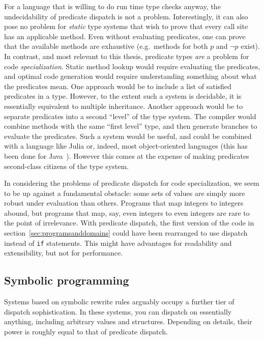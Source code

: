 For a language that is willing to do run time type checks anyway, the
undecidability of predicate dispatch is not a problem.
Interestingly, it can also pose no problem for \emph{static} type systems
that wish to prove that every call site has an applicable method.
Even without evaluating predicates, one can prove that the available methods
are exhaustive (e.g.\ methods for both $p$ and $\neg p$ exist).
In contrast, and most relevant to this thesis, predicate types \emph{are} a
problem for code \emph{specialization}.
Static method lookup would require evaluating the predicates, and optimal code
generation would require understanding something about what the predicates mean.
One approach would be to include a list of satisfied predicates in a type.
However, to the extent such a system is decidable, it is essentially equivalent
to multiple inheritance.
Another approach would be to separate predicates into a second ``level'' of the
type system.
The compiler would combine methods with the same ``first level'' type, and then
generate branches to evaluate the predicates.
Such a system would be useful, and could be
combined with a language like Julia or, indeed, most object-oriented
languages (this has been done for Java~\cite{Millstein:2009:EMP:1462166.1462168}).
However this comes at the expense of making predicates second-class
citizens of the type system.

In considering the problems of predicate dispatch for code specialization,
we seem to be up against a fundamental obstacle: some sets of values are
simply more robust under evaluation than others.
Programs that map integers to integers abound, but programs that map, say,
even integers to even integers are rare to the point of irrelevance.
With predicate dispatch, the first version of the code in
section~\ref{sec:programsanddomains} could have been rearranged to use
dispatch instead of \texttt{if} statements.
This might have advantages for readability and extensibility, but not for
performance.


\subsection{Symbolic programming}

Systems based on symbolic rewrite rules arguably occupy a further tier of
dispatch sophistication.
In these systems, you can dispatch on essentially anything, including arbitrary
values and structures.
Depending on details, their power is roughly equal to that of predicate
dispatch.

